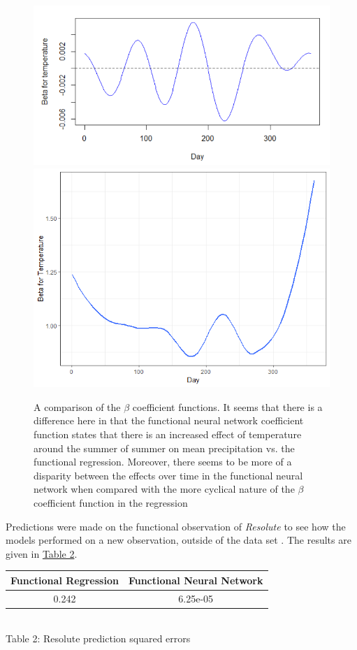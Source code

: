 \documentclass{article}
\begin{document}
\begin{figure}[h!]
  \centering
  \includegraphics[scale = 0.36]{freg_beta_plot.png}
  \includegraphics[scale = 0.37]{beta_coef_plot2.png}
  \label{fig:comp_betas}
  \caption{A comparison of the $\beta$ coefficient functions. It seems that there is a difference here in that the functional neural network coefficient function states that there is an increased effect of temperature around the summer of summer on mean precipitation vs. the functional regression. Moreover, there seems to be more of a disparity between the effects over time in the functional neural network when compared with the more cyclical nature of the $\beta$ coefficient function in the regression}
\end{figure}

\noindent Predictions were made on the functional observation of \textit{Resolute} to see how the models performed on a new observation, outside of the data set \cite{fda_pred}. The results are given in \hyperref[table:two]{Table 2}. 
\begin{center}
\label{table:two}
 \begin{tabular}{||c c||} 
 \hline
 Functional Regression & Functional Neural Network \\ [1ex] 
 \hline\hline
 0.242 & 6.25e-05 \\ [1ex] 
 \hline
\end{tabular}\\ \smallskip
Table 2: Resolute prediction squared errors
\end{center}
\end{document}
